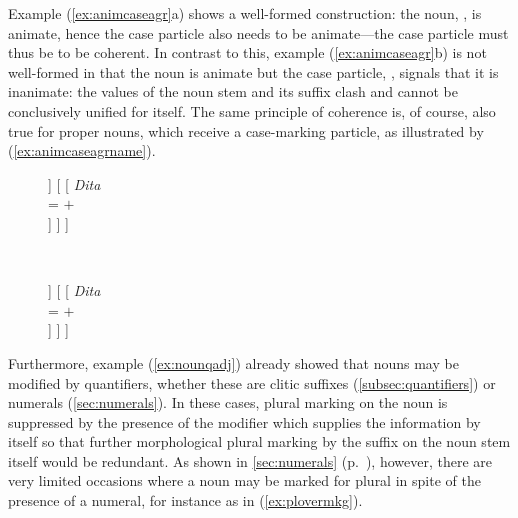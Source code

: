 Example (\ref{ex:animcaseagr}a) shows a well-formed construction: the noun,
, is animate, hence the case particle also needs to be 
animate---the case particle must thus be  to be coherent. In
contrast to this, example (\ref{ex:animcaseagr}b) is not well-formed in that
the noun is animate but the case particle, , signals that it
is inanimate: the \Anim{} values of the noun stem and its suffix clash and
cannot be conclusively unified for  itself. The same principle of
coherence is, of course, also true for proper nouns, which receive a
case-marking particle, as illustrated by (\ref{ex:animcaseagrname}).

\begin{figure}
\ex\label{ex:animcaseagrname}
\begin{minipage}[t]{.5\remaining}
\tl\quad\label{ex:animokname} %
\begin{forest}
[\anno{\xhead{N}}
	[\anno{Cl}
		[{%
			\textit{ang} \\
			\ups{\Anim} = $+$ \\
			\ups{\Case} = \Aarg{} \\
		}]
	]
	[
		[{%
			\textit{Dita} \\
			\ups{\Anim} = $+$ \\
		}]
	]
]
\end{forest}
\end{minipage}
~
\begin{minipage}[t]{.5\remaining}
\tl\quad\label{ex:animclashname} %
\ljudge*\begin{forest}
[\anno{\xhead{N}}
	[\anno{Cl}
		[{%
			\textit{eng} \\
			\ups{\Anim} = $-$ \\
			\ups{\Case} = \Aarg{} \\
		}]
	]
	[
		[{%
			\textit{Dita} \\
			\ups{\Anim} = $+$ \\
		}]
	]
]
\end{forest}
\end{minipage}
\xe
\end{figure}

Furthermore, example (\ref{ex:nounqadj}) already showed that nouns may be
modified by quantifiers, whether these are clitic suffixes
(\autoref{subsec:quantifiers}) or numerals (\autoref{sec:numerals}). In these
cases, plural marking on the noun is suppressed by the presence of the modifier
which supplies the information by itself so that further morphological plural
marking by the suffix  on the noun stem itself would be
redundant. As shown in \autoref{sec:numerals} (p.~\pageref{hundreds}), however,
there are very limited occasions where a noun may be marked for plural in spite
of the presence of a numeral, for instance as in (\ref{ex:plovermkg}).

